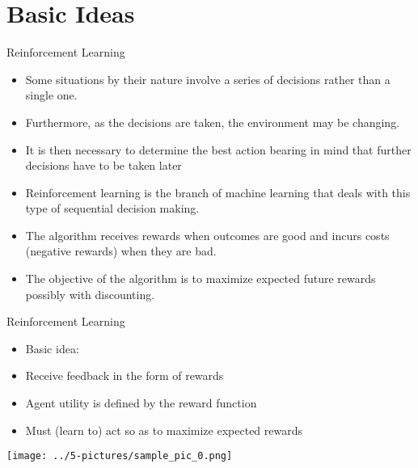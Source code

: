 \documentclass[11pt]{beamer}
\begin{document}
\section{Basic Ideas}
\begin{frame}{Reinforcement Learning}
	\begin{itemize}
		\item Some situations by their nature involve a series of decisions rather than a single one. 
		\item Furthermore, as the decisions are taken, the environment may be changing. 
		\item It is then necessary to determine the best action bearing in mind that further decisions have to be taken later
		\item Reinforcement learning is the branch of machine learning that deals with this type of sequential decision making.
		\item The algorithm receives rewards when outcomes are good and incurs costs (negative rewards) when they are bad. 
		\item The objective of the algorithm is to maximize expected future rewards possibly with discounting.
	\end{itemize}
\end{frame}
\begin{frame}{Reinforcement Learning}
	\begin{itemize}
		\item Basic idea:
		\item Receive feedback in the form of rewards
		\item Agent utility is defined by the reward function
		\item Must (learn to) act so as to maximize expected rewards
	\end{itemize}
	\begin{center}
	\texttt{[image: ../5-pictures/sample\_pic\_0.png]}
	\end{center}
\end{frame}
\end{document}
